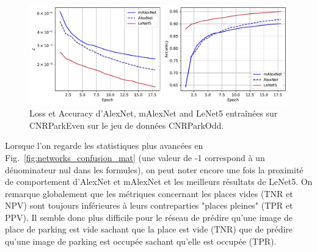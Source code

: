 \documentclass[12pt]{article}
\begin{document}
\begin{figure}[htbp]
    \centering
    \includegraphics[width=\textwidth]{figures/metrics/loss_acc.pdf}
    \caption{Loss et Accuracy d'AlexNet, mAlexNet and LeNet5 entraînées sur CNRParkEven sur le jeu de données CNRParkOdd.}
    \label{fig:networks_loss_acc}
\end{figure}

Lorsque l'on regarde les statistiques plus avancées en Fig.~\ref{fig:networks_confusion_mat} (une valeur de -1 correspond à un dénominateur nul dans les formules), on peut noter encore une fois la proximité de comportement d'AlexNet et mAlexNet et les meilleurs résultats de LeNet5. On remarque globalement que les métriques concernant les places vides (TNR et NPV) sont toujours inférieures à leurs contreparties "places pleines" (TPR et PPV). Il semble donc plus difficile pour le réseau de prédire qu'une image de place de parking est vide sachant que la place est vide (TNR) que de prédire qu'une image de parking est occupée sachant qu'elle est occupée (TPR).
\end{document}
